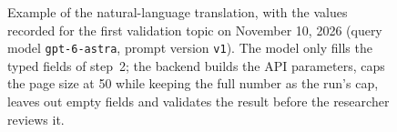 \begin{figure}[htbp]
    \caption[Example of the natural-language translation]{Example of the natural-language translation, with the values recorded for the first validation topic on November 10, 2026 (query model \texttt{gpt-6-astra}, prompt version \texttt{v1}). The model only fills the typed fields of step~2; the backend builds the API parameters, caps the page size at 50 while keeping the full number as the run's cap, leaves out empty fields and validates the result before the researcher reviews it.}
    \label{fig:translation_example}
\end{figure}

